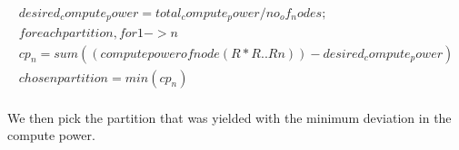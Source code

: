 \begin{equation}
\begin{array}{c}
desired_compute_power = total_compute_power / no_of_nodes;\\

for each partition, for 1->n\\
cp_n = sum( ( compute power of node ( R * R .. Rn ) ) -
desired_compute_power )\\

chosen partition = min( cp_n  )\\
\end{array}
\end{equation}

We then pick the partition that was yielded with the minimum deviation
in the compute power.


